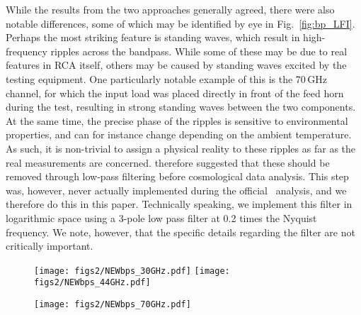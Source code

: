\documentclass[twocolumn]{aa}
\newcommand{\?}[1]{\textcolor{red}{{\bf [#1]}}}
\begin{document}
While the results from the two approaches generally agreed, there were also
notable differences, some of which may be identified by eye in
Fig.~\ref{fig:bp_LFI}. Perhaps the most striking feature is standing waves,
which result in high-frequency ripples across the bandpass. While some of these
may be due to real features in RCA itself, others may be caused by standing
waves excited by the testing equipment. One particularly notable example of this
is the 70\,GHz channel, for which the input load was placed directly in front of
the feed horn during the test, resulting in strong standing waves between the two components. At the same
time, the precise phase of the ripples is sensitive to environmental properties,
and can for instance change depending on the ambient temperature. As such, it is
non-trivial to assign a physical reality to these ripples as far as the real
measurements are concerned. \citet{zonca2009} therefore suggested that these
should be removed through low-pass filtering before cosmological data analysis.
This step was, however, never actually implemented during the official \Planck\
analysis, and we therefore do this in this paper. Technically speaking, we
implement this filter in logarithmic space using a 3-pole low pass filter at 0.2
times the Nyquist frequency. We note, however, that the specific details
regarding the filter are not critically important.

\begin{figure*}[p]
  \center
  \begin{subfigure}{0.45\linewidth}
    \texttt{[image: figs2/NEWbps\_30GHz.pdf]}\vspace*{2.1cm}
    \texttt{[image: figs2/NEWbps\_44GHz.pdf]}
  \end{subfigure}
  \begin{subfigure}{0.45\linewidth}
    \texttt{[image: figs2/NEWbps\_70GHz.pdf]}
  \end{subfigure}
  \caption{Normalized radiometer bandpass profiles for LFI 30\,GHz
    (\emph{top left}), 44\,GHz (\emph{bottom left}), and 70\,GHz
    (\emph{right}). Individual bandpasses are highlighted in bold and the remaining are plotted behind for ease of comparison.}
  \label{fig:bp_LFI}
\end{figure*}
\end{document}
